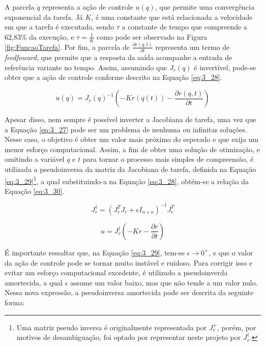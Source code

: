A parcela $\dot{q}$ representa a ação de controle $u(q)$, que permite uma convergência exponencial da tarefa. Já $K$, é uma constante que está relacionada a velocidade em que a tarefa é executada, sendo $\tau$ a constante de tempo que compreende a 62,83\% da execução, e $\tau = \frac{1}{K}$ como pode ser observado na Figura \ref{fig:FuncaoTarefa}. Por fim, a parcela de $\frac{\partial r(q,t)}{\partial t}$ representa um termo de \textit{feedfoward}, que permite que a resposta da saída acompanhe a entrada de referência variante no tempo. Assim, assumindo que $J_r(q)$ é invertível, pode-se obter que a ação de controle conforme descrito na Equação \ref{eq:3_28}.

\begin{equation}
u(q) = J_r(q)^{-1} (-Kr(q(t)) - \frac{\partial r(q,t)}{\partial t})
\label{eq:3_28}
\end{equation}


Apesar disso, nem sempre é possível inverter a Jacobiana de tarefa, uma vez que a Equação \ref{eq:3_27} pode ser um problema de nenhuma ou infinitas soluções. Nesse caso, o objetivo é obter um valor mais próximo do esperado e que exija um menor esforço computacional. Assim, a fim de obter uma solução de otimização, e omitindo a variável $q$ e $t$ para tornar o processo mais simples de compreensão, é utilizada a pseudoinversa da matriz da Jacobiana de tarefa, definida na Equação \ref{eq:3_29}\footnote{Uma matriz pseudo inversa é originalmente representada por $J_r^+$, porém, por motivos de desambiguação, foi optado por representar neste projeto por $J_r^{\dagger}$.}, a qual substituindo-a na Equação \ref{eq:3_28}, obtém-se a relação da Equação \ref{eq:3_30}.

\begin{equation}
J_r^{\dagger} = (J_r^T J_r + \epsilon I_{n\times n})^{-1} J_r^T
\label{eq:3_29}
\end{equation}

\begin{equation}
u = J_r^{\dagger} (-Kr - \frac{\partial r}{\partial t})
\label{eq:3_30}
\end{equation}

É importante ressaltar que, na Equação \ref{eq:3_29}, tem-se $\epsilon \rightarrow 0^+$, e que o valor da ação de controle pode se tornar muito instável e ruidoso. Para corrigir isso e evitar um esforço computacional excedente, é utilizado a pseudoinverda amortecida, a qual $\epsilon$ assume um valor baixo, mas que não tende a um valor nulo. Nessa nova expressão, a pseudoinversa amortecida pode ser descrita da seguinte forma:

